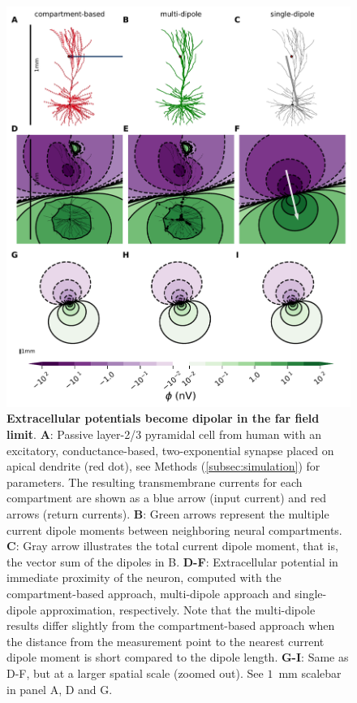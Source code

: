 \documentclass[preprint,10pt,authoryear]{elsarticle}
\begin{document}
	
\begin{figure}[H]
	\centering
	\includegraphics[width=1.0\textwidth]{fig_dipole_field_passiveTrue_single_syn481}
	\caption{\textbf{Extracellular potentials become dipolar in the far field limit}. 
		\textbf{A}: Passive layer-2/3 pyramidal cell from human \citep{EYAL2016} with an excitatory, conductance-based, two-exponential synapse placed on apical dendrite (red dot), see Methods (\ref{subsec:simulation}) for parameters. The resulting transmembrane currents for each compartment are shown as a blue arrow (input current) and red arrows (return currents).
		\textbf{B}: Green arrows represent the multiple current dipole moments between neighboring neural compartments.
		\textbf{C}: Gray arrow illustrates the total current dipole moment, that is, the vector sum of the dipoles in B.
	\textbf{D-F}: Extracellular potential in immediate proximity of the neuron, computed with the compartment-based approach, multi-dipole approach and single-dipole approximation, respectively. Note that the multi-dipole results differ slightly from the compartment-based approach when the distance from the measurement point to the nearest current dipole moment is short compared to the dipole length.
\textbf{G-I}: Same as D-F, but at a larger spatial scale (zoomed out). See $1$~mm scalebar in panel A, D and G.
}
\label{fig:dipole_field}
\end{figure}
\end{document}
